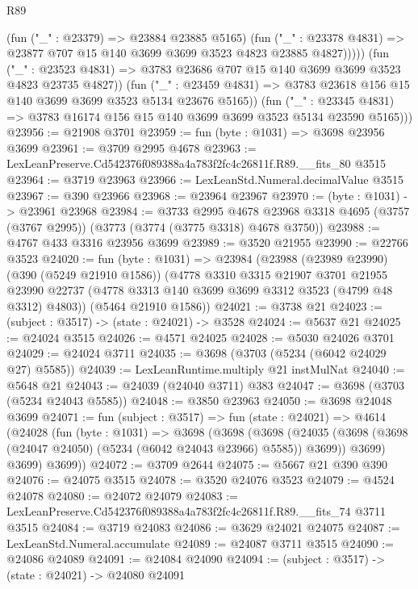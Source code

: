 \begin{lexlean}{R89}
\begin{coremodule}
                    (fun ("_" : @23379) => @23884 @23885 @5165)
                    (fun ("_" : @23378 @4831) =>
                    @23877 @707 @15 @140 @3699 @3699 @3523 @4823 @23885 @4827)))))
            (fun ("_" : @23523 @4831) =>
            @3783 @23686 @707 @15 @140 @3699 @3699 @3523 @4823 @23735 @4827))
          (fun ("_" : @23459 @4831) =>
          @3783 @23618 @156 @15 @140 @3699 @3699 @3523 @5134 @23676 @5165))
        (fun ("_" : @23345 @4831) =>
        @3783 @16174 @156 @15 @140 @3699 @3699 @3523 @5134 @23590 @5165)))
@23956 := @21908 @3701
@23959 := fun (byte : @1031) => @3698 @23956 @3699
@23961 := @3709 @2995 @4678
@23963 := LexLeanPreserve.Cd542376f089388a4a783f2fc4c26811f.R89.__fits_80 @3515
@23964 := @3719 @23963
@23966 := LexLeanStd.Numeral.decimalValue @3515
@23967 := @390 @23966
@23968 := @23964 @23967
@23970 := (byte : @1031) -> @23961 @23968
@23984 := @3733
    @2995
    @4678
    @23968
    @3318
    @4695
    (@3757 (@3767 @2995))
    (@3773 (@3774 (@3775 @3318) @4678 @3750))
@23988 := @4767 @433 @3316 @23956 @3699
@23989 := @3520 @21955
@23990 := @22766 @3523
@24020 := fun (byte : @1031) =>
  @23984
    (@23988
      (@23989 @23990)
      (@390 (@5249 @21910 @1586))
      (@4778
        @3310
        @3315
        @21907
        @3701
        @21955
        @23990
        @22737
        (@4778 @3313 @140 @3699 @3699 @3312 @3523 (@4799 @48 @3312) @4803))
      (@5464 @21910 @1586))
@24021 := @3738 @21
@24023 := (subject : @3517) -> (state : @24021) -> @3528
@24024 := @5637 @21
@24025 := @24024 @3515
@24026 := @4571 @24025
@24028 := @5030 @24026 @3701
@24029 := @24024 @3711
@24035 := @3698 (@3703 (@5234 (@6042 @24029 @27) @5585))
@24039 := LexLeanRuntime.multiply @21 instMulNat
@24040 := @5648 @21
@24043 := @24039 (@24040 @3711) @383
@24047 := @3698 (@3703 (@5234 @24043 @5585))
@24048 := @3850 @23963
@24050 := @3698 @24048 @3699
@24071 := fun (subject : @3517) =>
  fun (state : @24021) =>
  @4614
    (@24028
      (fun (byte : @1031) =>
      @3698
        (@3698
          (@3698
            (@24035 (@3698 (@3698 (@24047 @24050) (@5234 (@6042 @24043 @23966) @5585)) @3699))
            @3699)
          @3699)
        @3699))
@24072 := @3709 @2644
@24075 := @5667 @21 @390 @390
@24076 := @24075 @3515
@24078 := @3520 @24076 @3523
@24079 := @4524 @24078
@24080 := @24072 @24079
@24083 := LexLeanPreserve.Cd542376f089388a4a783f2fc4c26811f.R89.__fits_74 @3711 @3515
@24084 := @3719 @24083
@24086 := @3629 @24021 @24075
@24087 := LexLeanStd.Numeral.accumulate
@24089 := @24087 @3711 @3515
@24090 := @24086 @24089
@24091 := @24084 @24090
@24094 := (subject : @3517) -> (state : @24021) -> @24080 @24091

\end{coremodule}
\end{lexlean}
